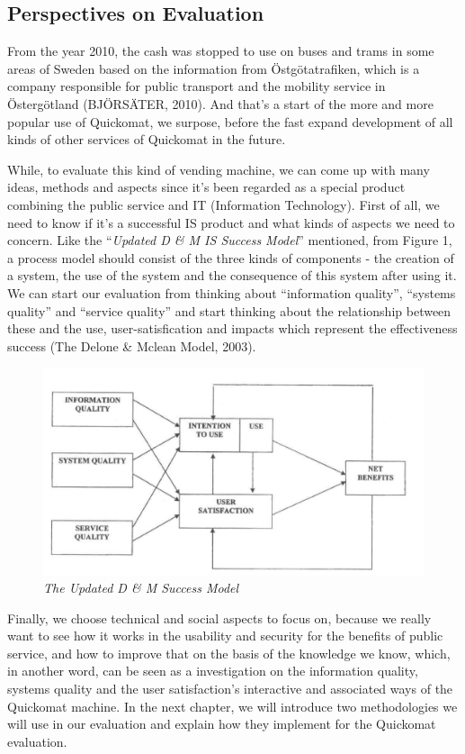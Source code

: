 \documentclass[twocolumn]{article}
\begin{document}
\subsection{Perspectives on Evaluation}
From the year 2010, the cash was stopped to use on buses and trams in some areas of Sweden based on the information from Östgötatrafiken, which is a company responsible for public transport and the mobility service in Östergötland (BJÖRSÄTER, 2010). And that’s a start of the more and more popular use of Quickomat, we surpose, before the fast expand development of all kinds of other services of Quickomat in the future. 

While, to evaluate this kind of vending machine, we can come up with many ideas, methods and aspects since it’s been regarded as a special product combining the public service and IT (Information Technology). First of all, we need to know if it's a successful IS product and what kinds of aspects we need to concern. Like the “\emph{Updated D \& M IS Success Model}” mentioned, from Figure 1, a process model should consist of the three kinds of components - the creation of a system, the use of the system and the consequence of this system after using it. We can start our evaluation from thinking about “information quality”, “systems quality” and “service quality” and start thinking about the relationship between these and the use, user-satisfication and impacts which represent the effectiveness success (The Delone \& Mclean Model, 2003). 
\begin{figure}
  \centering
  \includegraphics[width=\columnwidth, clip=true]{fig/DM-model.png}
  \caption{\emph{The Updated D \& M Success Model}}
  \label{fig:DM-model}
\end{figure}

Finally, we choose technical and social aspects to focus on, because we really want to see how it works in the usability and security for the benefits of public service, and how to improve that on the basis of the knowledge we know, which, in another word, can be seen as a investigation on the information quality, systems quality and the user satisfaction's interactive and associated ways of the Quickomat machine. In the next chapter, we will introduce two methodologies we will use in our evaluation and explain how they implement for the Quickomat evaluation. 
\end{document}
